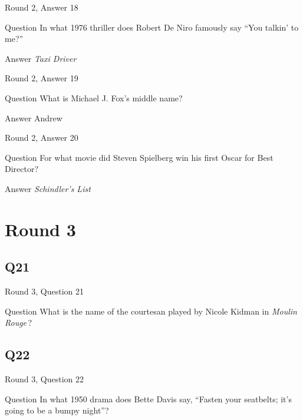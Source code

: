 \documentclass[11pt]{beamer}
\begin{document}
\begin{frame}[t]{Round 2, Answer 18}
\vspace{2em}
\begin{block}{Question}
In what 1976 thriller does Robert De Niro famously say ``You talkin' to me?''
\end{block}
\pause{}
\begin{block}{Answer}
\emph{Taxi Driver}
\end{block}
\end{frame}
    

\begin{frame}[t]{Round 2, Answer 19}
\vspace{2em}
\begin{block}{Question}
What is Michael J. Fox's middle name?
\end{block}
\pause{}
\begin{block}{Answer}
Andrew
\end{block}
\end{frame}
    

\begin{frame}[t]{Round 2, Answer 20}
\vspace{2em}
\begin{block}{Question}
For what movie did Steven Spielberg win his first Oscar for Best Director?
\end{block}
\pause{}
\begin{block}{Answer}
\emph{Schindler's List}
\end{block}
\end{frame}
    

\section{Round 3}
    

\subsection*{Q21}
\begin{frame}[t]{Round 3, Question 21}
\vspace{2em}
\begin{block}{Question}
What is the name of the courtesan played by Nicole Kidman in \emph{Moulin Rouge}\,?
\end{block}
\end{frame}
    

\subsection*{Q22}
\begin{frame}[t]{Round 3, Question 22}
\vspace{2em}
\begin{block}{Question}
In what 1950 drama does Bette Davis say, ``Fasten your seatbelts; it's going to be a bumpy night''?
\end{block}
\end{frame}
    
\end{document}
